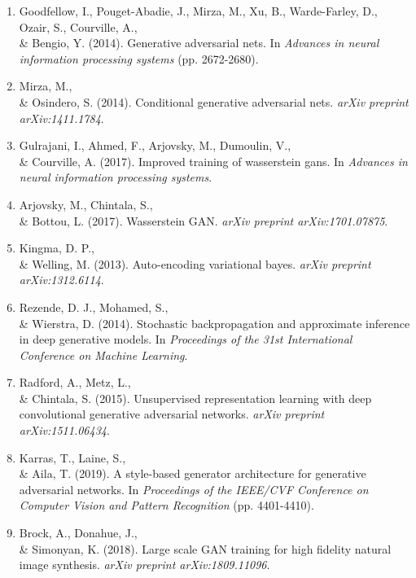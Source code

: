 \documentclass{article}
\begin{document}
\begin{enumerate}
\item Goodfellow, I., Pouget-Abadie, J., Mirza, M., Xu, B., Warde-Farley, D., Ozair, S., Courville, A., \\& Bengio, Y. (2014). Generative adversarial nets. In \textit{Advances in neural information processing systems} (pp. 2672-2680).

\item Mirza, M., \\& Osindero, S. (2014). Conditional generative adversarial nets. \textit{arXiv preprint arXiv:1411.1784}.

\item Gulrajani, I., Ahmed, F., Arjovsky, M., Dumoulin, V., \\& Courville, A. (2017). Improved training of wasserstein gans. In \textit{Advances in neural information processing systems}.

\item Arjovsky, M., Chintala, S., \\& Bottou, L. (2017). Wasserstein GAN. \textit{arXiv preprint arXiv:1701.07875}.

\item Kingma, D. P., \\& Welling, M. (2013). Auto-encoding variational bayes. \textit{arXiv preprint arXiv:1312.6114}.

\item Rezende, D. J., Mohamed, S., \\& Wierstra, D. (2014). Stochastic backpropagation and approximate inference in deep generative models. In \textit{Proceedings of the 31st International Conference on Machine Learning}.

\item Radford, A., Metz, L., \\& Chintala, S. (2015). Unsupervised representation learning with deep convolutional generative adversarial networks. \textit{arXiv preprint arXiv:1511.06434}.

\item Karras, T., Laine, S., \\& Aila, T. (2019). A style-based generator architecture for generative adversarial networks. In \textit{Proceedings of the IEEE/CVF Conference on Computer Vision and Pattern Recognition} (pp. 4401-4410).

\item Brock, A., Donahue, J., \\& Simonyan, K. (2018). Large scale GAN training for high fidelity natural image synthesis. \textit{arXiv preprint arXiv:1809.11096}.


\end{enumerate}
\end{document}
